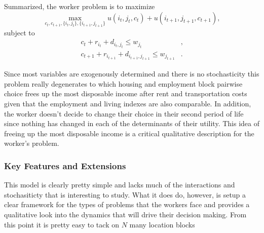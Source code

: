 \documentclass[11pt,english]{article}
\begin{document}
Summarized, the worker problem is to maximize $$\max_{c_t, c_{t+1}, \{i_t, j_t\}, \{i_{t+1}, j_{t+1}\}} u\left(i_t,j_t, c_t\right) + u\left(i_{t+1},j_{t+1}, c_{t+1}\right),$$
subject to \begin{align*}
c_t + r_{i_t} + d_{i_t,j_t}\leq w_{j_t}&,\\
c_{t+1} + r_{i_{t+1}} + d_{i_{t+1}, j_{t+1}}\leq w_{j_{t+1}}&.
\end{align*}

\noindent Since most variables are exogenously determined and there is no stochasticity this problem really degenerates to which housing and employment block pairwise choice frees up the most disposable income after rent and transportation costs given that the employment and living indexes are also comparable. In addition, the worker doesn't decide to change their choice in their second period of life since nothing has changed in each of the determinants of their utility. This idea of freeing up the most disposable income is a critical qualitative description for the worker's problem.

\subsubsection{Key Features and Extensions}

This model is clearly pretty simple and lacks much of the interactions and stochasiticty that is interesting to study. What it does do, however, is setup a clear framework for the types of problems that the workers face and provides a qualitative look into the dynamics that will drive their decision making. From this point it is pretty easy to tack on $N$ many location blocks 


\newpage




\end{document}
